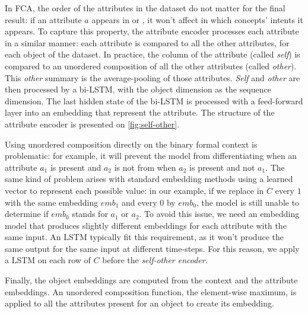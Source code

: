 In FCA, the order of the attributes in the dataset do not matter for the final result: if an attribute $a$ appears in  or , it won't affect in which concepts' intents it appears.
To capture this property, the attribute encoder processes each attribute in a similar manner:
each attribute is compared to all the other attributes, for each object of the dataset. 
%
In practice, the column of the attribute (called \emph{self}) is compared to an unordered composition of all the other attributes (called \emph{other}).
This \emph{other} summary is the average-pooling of those attributes.
\emph{Self} and \emph{other} are then processed by a bi-LSTM, with the object dimension as the sequence dimension.
The last hidden state of the bi-LSTM is processed with a feed-forward layer into an embedding that represent the attribute.
The structure of the attribute encoder is presented on \autoref{fig:self-other}.

Using unordered composition directly on the binary formal context is problematic: for example, it will prevent the model from differentiating when an attribute $a_1$ is present and $a_2$ is not from when $a_2$ is present and not $a_1$.
The same kind of problem arises with standard embedding methods using a learned vector to represent each possible value: in our example, if we replace in $C$ every $1$ with the same embedding $emb_1$ and every $0$ by $emb_0$, the model is still unable to determine if $emb_0$ stands for $a_1$ or $a_2$.
To avoid this issue, we need an embedding model that produces slightly different embeddings for each attribute with the same input. An LSTM typically fit this requirement, as it won't produce the same output for the same input at different time-steps.
For this reason, we apply a LSTM on each row of $C$ before the \textit{self-other encoder}.

Finally, the object embeddings are computed from the context and the attribute embeddings.
An unordered composition function, the element-wise maximum, is applied to all the attributes present for an object to create its embedding.

